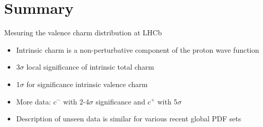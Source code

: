 \documentclass[aspectratio=43, 8pt,t]{beamer}
\begin{document}

\section{Summary}
\begin{frame}[c]{Mesuring the valence charm distribution at LHCb}
  \begin{itemize}
    \setlength\itemsep{1.5em} %
    \item Intrinsic charm is a non-perturbative component of the proton wave function
    \item 3$\sigma$ local significance of intrinsic total charm
    \item 1$\sigma$ for significance intrinsic valence charm
    \item More data: $c^-$ with 2-4$\sigma$ significance and $c^+$ with 5$\sigma$

    \vspace*{1em}
    \item Description of unseen data is similar for various recent global PDF sets
  \end{itemize}

  \vspace*{5em}
\end{frame}
\end{document}
